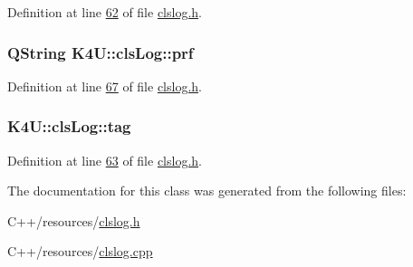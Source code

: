 Definition at line \hyperlink{clslog_8h_source_l00062}{62} of file \hyperlink{clslog_8h_source}{clslog.\-h}.

\hypertarget{class_k4_u_1_1cls_log_ae3b65749abbcf2a7bb5fa4edbd1702ad}{
\subsubsection[{prf}]{\setlength{\rightskip}{0pt plus 5cm}Q\-String K4\-U\-::cls\-Log\-::prf\hspace{0.3cm}{\ttfamily [private]}}}\label{da/d64/class_k4_u_1_1cls_log_ae3b65749abbcf2a7bb5fa4edbd1702ad}


Definition at line \hyperlink{clslog_8h_source_l00067}{67} of file \hyperlink{clslog_8h_source}{clslog.\-h}.

\hypertarget{class_k4_u_1_1cls_log_a5ccda7703f98df03a812bc5c6f51aae9}{
\subsubsection[{tag}]{ K4\-U\-::cls\-Log\-::tag\hspace{0.3cm}{\ttfamily [private]}}}\label{da/d64/class_k4_u_1_1cls_log_a5ccda7703f98df03a812bc5c6f51aae9}


Definition at line \hyperlink{clslog_8h_source_l00063}{63} of file \hyperlink{clslog_8h_source}{clslog.\-h}.



The documentation for this class was generated from the following files\-:\begin{DoxyCompactItemize}
\item 
C++/resources/\hyperlink{clslog_8h}{clslog.\-h}\item 
C++/resources/\hyperlink{clslog_8cpp}{clslog.\-cpp}\end{DoxyCompactItemize}
